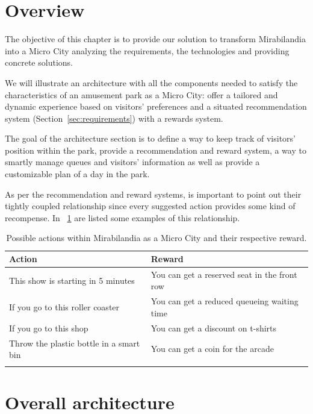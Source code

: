 \section{Overview}\label{sec:overview}
The objective of this chapter is to provide our solution to transform Mirabilandia into a Micro City analyzing the requirements, the technologies and providing concrete solutions.

We will illustrate an architecture with all the components needed to satisfy the characteristics of an amusement park as a Micro City: offer a tailored and dynamic experience based on visitors' preferences and a situated recommendation system (Section~\ref{sec:requirements}) with a rewards system.

The goal of the architecture section is to define a way to keep track of visitors' position within the park, provide a recommendation and reward system, a way to smartly manage queues and visitors' information as well as provide a customizable plan of a day in the park.

As per the recommendation and reward systems, is important to point out their tightly coupled relationship since every suggested action provides some kind of recompense.
In ~\ref{tab:actions-rewards} are listed some examples of this relationship.

\begin{longtable}{|l|l|}
	\hline
	\textbf{Action}                                  & \textbf{Reward}                      \\
	\hline
	This show is starting in 5 minutes  & You can get a reserved seat in the front row \\
	\hline
	If you go to this roller coaster    & You can get a reduced queueing waiting time           \\
	\hline
	If you go to this shop              & You can get a discount on t-shirts           \\
	\hline
	Throw the plastic bottle in a smart bin & You can get a coin for the arcade            \\
	\hline
	\caption{Possible actions within Mirabilandia as a Micro City and their respective reward.}
	\label{tab:actions-rewards}
\end{longtable}

\section{Overall architecture}\label{sec:mira-microcity}


